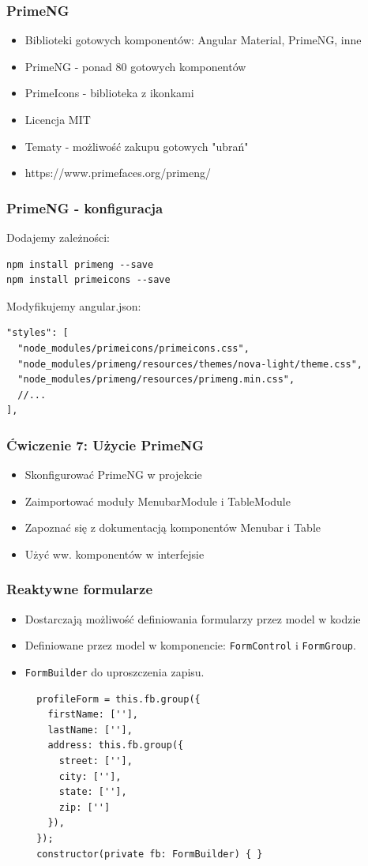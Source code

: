 \documentclass{beamer}
\begin{document}
\begin{frame}
    \frametitle{PrimeNG}
    \begin{itemize}
        \item Biblioteki gotowych komponentów: Angular Material, PrimeNG, inne
        \item PrimeNG - ponad 80 gotowych komponentów
        \item PrimeIcons - biblioteka z ikonkami
        \item Licencja MIT
        \item Tematy - możliwość zakupu gotowych "ubrań"
        \item https://www.primefaces.org/primeng/
    \end{itemize}
\end{frame}

\begin{frame}[fragile]
    \frametitle{PrimeNG - konfiguracja}
    Dodajemy zależności:
\begin{lstlisting}
npm install primeng --save
npm install primeicons --save
\end{lstlisting}
    Modyfikujemy angular.json:
\begin{lstlisting}
"styles": [
  "node_modules/primeicons/primeicons.css",
  "node_modules/primeng/resources/themes/nova-light/theme.css",
  "node_modules/primeng/resources/primeng.min.css",
  //...
],
\end{lstlisting}
\end{frame}

\begin{frame}
    \frametitle{Ćwiczenie 7: Użycie PrimeNG}
    \begin{itemize}
        \item Skonfigurować PrimeNG w projekcie
        \item Zaimportować moduły MenubarModule i TableModule
        \item Zapoznać się z dokumentacją komponentów Menubar i Table
        \item Użyć ww. komponentów w interfejsie
    \end{itemize}
\end{frame}

\begin{frame}[fragile]
    \frametitle{Reaktywne formularze}
    \begin{itemize}
        \item Dostarczają możliwość definiowania formularzy przez model w kodzie
        \item Definiowane przez model w komponencie: \lstinline{FormControl} i \lstinline{FormGroup}.
        \item \lstinline{FormBuilder} do uproszczenia zapisu.
\begin{lstlisting}
  profileForm = this.fb.group({
    firstName: [''],
    lastName: [''],
    address: this.fb.group({
      street: [''],
      city: [''],
      state: [''],
      zip: ['']
    }),
  });
  constructor(private fb: FormBuilder) { }
\end{lstlisting}
    \end{itemize}
\end{frame}
\end{document}
